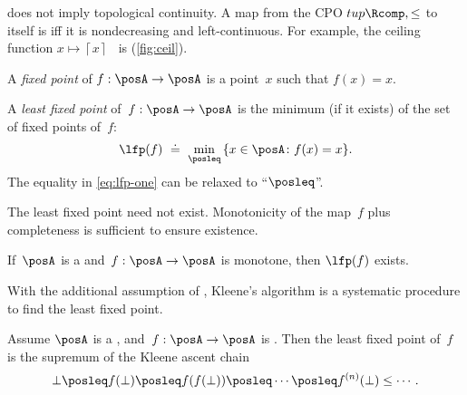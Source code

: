 \begin{remark}
  \scottcontinuity does not imply topological continuity. A map from
  the CPO $tup{\Rcomp,\leq}$ to itself is \scottcontinuous
  iff it is nondecreasing and left-continuous. For example, the ceiling
  function $x\mapsto\left\lceil x\right\rceil $~ is \scottcontinuous
  (\cref{fig:ceil}).
\end{remark}

\emph{}

A \emph{fixed point} of $f:\posA\to\posA$ is a point~$x$
such that $f(x)=x$.
\begin{definition}
  A \emph{least fixed point} of~$f:\posA\to\posA$ is the minimum
  (if it exists) of the set of fixed points of~$f$:
  \begin{equation}
    \lfp(f)\,\,\doteq\,\,\min_{\posleq}\,\{x\in\posA\colon f(x)=x\}.\label{eq:lfp-one}
  \end{equation}
  The equality in \cref{eq:lfp-one} can be relaxed to ``$\posleq$''.
\end{definition}
The least fixed point need not exist. Monotonicity of the map~$f$
plus completeness is sufficient to ensure existence.
\begin{lemma}
  \label{lem:CPO-fix-point-2}If~$\posA$ is a \CPO and~$f:\posA\rightarrow\posA$
  is monotone, then $\lfp(f)$ exists.
\end{lemma}


With the additional assumption of \scottcontinuity, Kleene's algorithm
is a systematic procedure to find the least fixed point.
\begin{lemma}
  \label{lem:kleene-1}Assume $\posA$ is a \CPO, and~$f:\posA\rightarrow\posA$
  is \scottcontinuous. Then the least fixed point of~$f$ is the supremum
  of the Kleene ascent chain
  \[
    \bot\posleq f(\bot)\posleq f(f(\bot))\posleq\cdots\posleq f^{(n)}(\bot)\leq\cdots.
  \]
\end{lemma}
